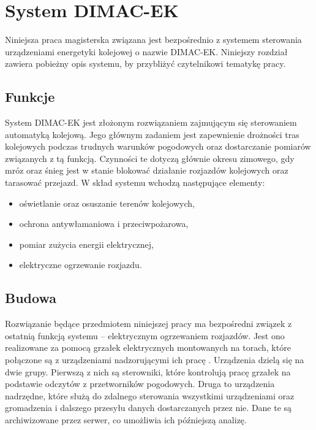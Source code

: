 \chapter{System DIMAC-EK}

Niniejsza praca magisterska związana jest bezpośrednio z systemem sterowania urządzeniami energetyki kolejowej o nazwie \mbox{DIMAC-EK}. Niniejszy rozdział zawiera pobieżny opis systemu, by przybliżyć czytelnikowi tematykę pracy.

\section{Funkcje}

System \mbox{DIMAC-EK} jest złożonym rozwiązaniem zajmującym się sterowaniem automatyką kolejową\cite{dimacek-katalog}. Jego głównym zadaniem jest zapewnienie drożności tras kolejowych podczas trudnych warunków pogodowych oraz dostarczanie pomiarów związanych z tą funkcją. Czynności te dotyczą głównie okresu zimowego, gdy mróz oraz śnieg jest w stanie blokować działanie rozjazdów kolejowych oraz tarasować przejazd. W skład systemu wchodzą następujące elementy:

\begin{itemize}
\item oświetlanie oraz osuszanie terenów kolejowych,
\item ochrona antywłamaniowa i przeciwpożarowa,
\item pomiar zużycia energii elektrycznej,
\item elektryczne ogrzewanie rozjazdu.
\end{itemize}

\section{Budowa}
Rozwiązanie będące przedmiotem niniejszej pracy ma bezpośredni związek z ostatnią funkcją systemu -- elektrycznym ogrzewaniem rozjazdów. Jest ono realizowane za pomocą grzałek elektrycznych montowanych na torach, które połączone są z urządzeniami nadzorującymi ich pracę \cite{dimacek-wytyczne}. Urządzenia dzielą się na dwie grupy. Pierwszą z nich są sterowniki, które kontrolują pracę grzałek na podstawie odczytów z przetworników pogodowych. Druga to urządzenia nadrzędne, które służą do zdalnego sterowania wszystkimi urządzeniami oraz gromadzenia i dalszego przesyłu danych dostarczanych przez nie. Dane te są archiwizowane przez serwer, co umożliwia ich późniejszą analizę.

